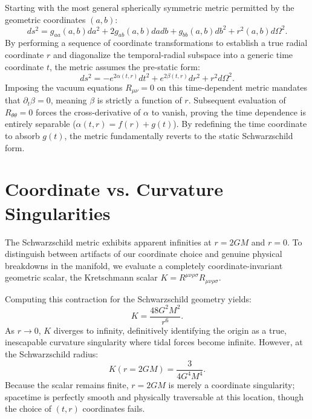 \documentclass[11pt, a4paper]{report}
\begin{document}
Starting with the most general spherically symmetric metric permitted by the geometric coordinates $(a, b)$:
\begin{equation}
ds^{2} = g_{aa}(a,b)da^{2} + 2g_{ab}(a,b)da db + g_{bb}(a,b)db^{2} + r^{2}(a,b)d\Omega^{2}.
\end{equation}
By performing a sequence of coordinate transformations to establish a true radial coordinate $r$ and diagonalize the temporal-radial subspace into a generic time coordinate $t$, the metric assumes the pre-static form:
\begin{equation}
ds^{2} = -e^{2\alpha(t,r)}dt^{2} + e^{2\beta(t,r)}dr^{2} + r^{2}d\Omega^{2}.
\end{equation}
Imposing the vacuum equations $R_{\mu\nu} = 0$ on this time-dependent metric mandates that $\partial_t \beta = 0$, meaning $\beta$ is strictly a function of $r$. Subsequent evaluation of $R_{\theta\theta}=0$ forces the cross-derivative of $\alpha$ to vanish, proving the time dependence is entirely separable ($\alpha(t,r) = f(r) + g(t)$). By redefining the time coordinate to absorb $g(t)$, the metric fundamentally reverts to the static Schwarzschild form.

\section{Coordinate vs. Curvature Singularities}
The Schwarzschild metric exhibits apparent infinities at $r=2GM$ and $r=0$. To distinguish between artifacts of our coordinate choice and genuine physical breakdowns in the manifold, we evaluate a completely coordinate-invariant geometric scalar, the Kretschmann scalar $K = R^{\mu\nu\rho\sigma}R_{\mu\nu\rho\sigma}$. 

Computing this contraction for the Schwarzschild geometry yields:
\begin{equation}
K = \frac{48G^{2}M^{2}}{r^{6}}.
\end{equation}
As $r \to 0$, $K$ diverges to infinity, definitively identifying the origin as a true, inescapable curvature singularity where tidal forces become infinite. However, at the Schwarzschild radius:
\begin{equation}
K(r=2GM) = \frac{3}{4G^{4}M^{4}}.
\end{equation}
Because the scalar remains finite, $r=2GM$ is merely a coordinate singularity; spacetime is perfectly smooth and physically traversable at this location, though the choice of $(t,r)$ coordinates fails.
\end{document}

